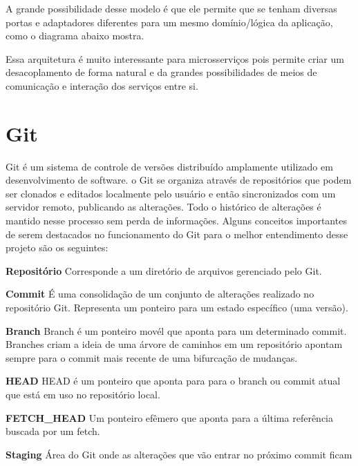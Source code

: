 \documentclass[]{politex}
\begin{document}
	A grande possibilidade desse modelo é que ele permite que se tenham diversas portas e adaptadores diferentes para um mesmo domínio/lógica da aplicação, como o diagrama abaixo mostra.
	
	Essa arquitetura é muito interessante para microsserviços pois permite criar um desacoplamento de forma natural e da grandes possibilidades de meios de comunicação e interação dos serviços entre si.
	
	\section{Git}
	
	Git é um sistema de controle de versões distribuído amplamente utilizado em desenvolvimento de software. o Git se organiza através de repositórios que podem ser clonados e editados localmente pelo usuário e então sincronizados com um servidor remoto, publicando as alterações. Todo o histórico de alterações é mantido nesse processo sem perda de informações.
	Alguns conceitos importantes de serem destacados no funcionamento do Git para o melhor entendimento desse projeto são os seguintes:
	
	\textbf{Repositório}
	\newline
	Corresponde a um diretório de arquivos gerenciado pelo Git.
	
	\textbf{Commit}
	\newline
	É uma consolidação de um conjunto de alterações realizado no repositório Git. Representa um ponteiro para um estado específico (uma versão).
	
	\textbf{Branch}
	\newline
	Branch é um ponteiro movél que aponta para um determinado commit. Branches criam a ideia de uma árvore de caminhos em um repositório apontam sempre para o commit mais recente de uma bifurcação de mudanças.
	
	\textbf{HEAD}
	\newline
	HEAD é um ponteiro que aponta para para o branch ou commit atual que está em uso no repositório local.
	
	\textbf{FETCH\_HEAD}
	\newline
	Um ponteiro efêmero que aponta para a última referência buscada por um fetch.
	
	\textbf{Staging}
	\newline
	Área do Git onde as alterações que vão entrar no próximo commit ficam
	
\end{document}
